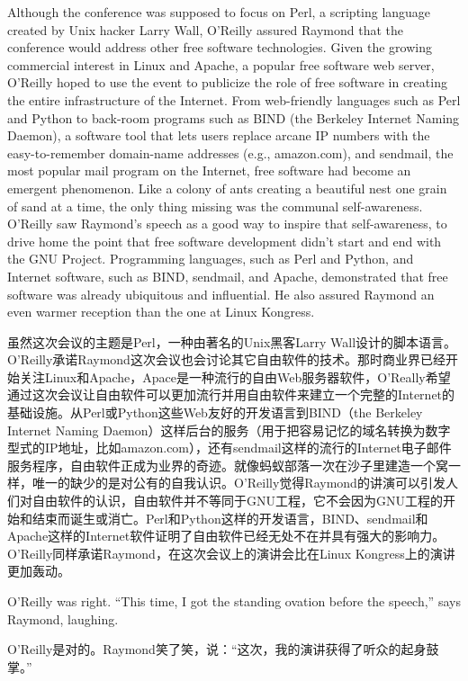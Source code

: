 \ifdefined\eng
Although the conference was supposed to focus on Perl, a scripting language created by Unix hacker Larry Wall, O'Reilly assured Raymond that the conference would address other free software technologies. Given the growing commercial interest in Linux and Apache, a popular free software web server, O'Reilly hoped to use the event to publicize the role of free software in creating the entire infrastructure of the Internet. From web-friendly languages such as Perl and Python to back-room programs such as BIND (the Berkeley Internet Naming Daemon), a software tool that lets users replace arcane IP numbers with the easy-to-remember domain-name addresses (e.g., amazon.com), and sendmail, the most popular mail program on the Internet, free software had become an emergent phenomenon. Like a colony of ants creating a beautiful nest one grain of sand at a time, the only thing missing was the communal self-awareness. O'Reilly saw Raymond's speech as a good way to inspire that self-awareness, to drive home the point that free software development didn't start and end with the GNU Project. Programming languages, such as Perl and Python, and Internet software, such as BIND, sendmail, and Apache, demonstrated that free software was already ubiquitous and influential. He also assured Raymond an even warmer reception than the one at Linux Kongress.
\fi

\ifdefined\chs
虽然这次会议的主题是Perl，一种由著名的Unix黑客Larry Wall设计的脚本语言。O'Reilly承诺Raymond这次会议也会讨论其它自由软件的技术。那时商业界已经开始关注Linux和Apache，Apace是一种流行的自由Web服务器软件，O'Really希望通过这次会议让自由软件可以更加流行并用自由软件来建立一个完整的Internet的基础设施。从Perl或Python这些Web友好的开发语言到BIND（the Berkeley Internet Naming Daemon）这样后台的服务（用于把容易记忆的域名转换为数字型式的IP地址，比如amazon.com），还有sendmail这样的流行的Internet电子邮件服务程序，自由软件正成为业界的奇迹。就像蚂蚁部落一次在沙子里建造一个窝一样，唯一的缺少的是对公有的自我认识。O'Reilly觉得Raymond的讲演可以引发人们对自由软件的认识，自由软件并不等同于GNU工程，它不会因为GNU工程的开始和结束而诞生或消亡。Perl和Python这样的开发语言，BIND、sendmail和Apache这样的Internet软件证明了自由软件已经无处不在并具有强大的影响力。O'Reilly同样承诺Raymond，在这次会议上的演讲会比在Linux Kongress上的演讲更加轰动。
\fi

\ifdefined\eng
O'Reilly was right. ``This time, I got the standing ovation before the speech,'' says Raymond, laughing.
\fi

\ifdefined\chs
O'Reilly是对的。Raymond笑了笑，说：“这次，我的演讲获得了听众的起身鼓掌。”
\fi

